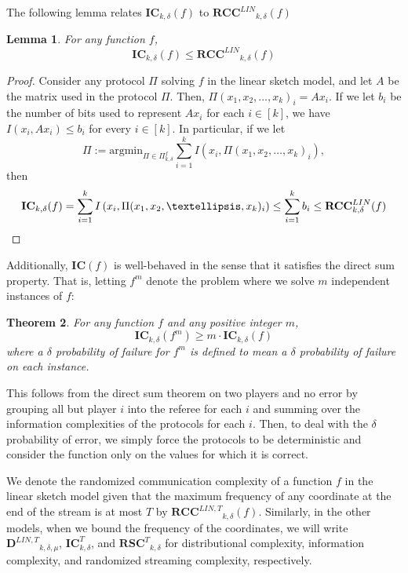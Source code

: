\documentclass[11pt]{article}
\numberwithin{equation}{section}
\newtheorem{theorem}{Theorem}[section]
\newtheorem{lemma}[theorem]{Lemma}
\theoremstyle{definition}
\theoremstyle{plain}
\newcommand{\eqdef}{\ensuremath{:=}}
\newcommand{\rscT}{\ensuremath{\mathbf{RSC}^T}}
\newcommand{\ic}{\ensuremath{\mathbf{IC}}}
\newcommand{\rcclin}{\ensuremath{\mathbf{RCC}^{LIN}}}
\newcommand{\rcclinT}{\ensuremath{\mathbf{RCC}^{LIN,T}}}
\newcommand{\DlinT}{\ensuremath{\mathbf{D}^{LIN,T}}}
\begin{document}
{\color{black}
The following lemma relates $\ic_{k,\delta}(f)$ to $\rcclin_{k,\delta}(f)$
%
\begin{lemma}
For any function $f$,
    $$\ic_{k,\delta}(f) \le \rcclin_{k,\delta}(f)$$
\end{lemma}
\begin{proof}
    Consider any protocol $\Pi$ solving $f$ in the linear sketch model, and let $A$ be the matrix used in the protocol $\Pi$. Then, $\Pi(x_1, x_2, \dots, x_k)_i = Ax_i$. If we let $b_i$ be the number of bits used to represent $Ax_i$ for each $i \in [k]$, we have $I(x_i, Ax_i) \le b_i$ for every $i \in [k]$. In particular, if we let
    $$\Pi \eqdef \text{argmin}_{\Pi \in \Pi^f_{k,\delta}} \sum_{i=1}^k I\left(x_i, \Pi(x_1, x_2, \dots, x_k)_i\right),$$
    then
\begin{equation*}
  \ic_{k,\delta}(f) = \sum_{i=1}^k I\left(x_i, \Pi(x_1, x_2, \dots, x_k)_i\right) \le \sum_{i=1}^k b_i \le \rcclin_{k,\delta}(f) \qedhere
\end{equation*}
%
\end{proof}
}
Additionally, $\ic(f)$ is well-behaved in the sense that it satisfies the direct sum property. That is, letting $f^m$ denote the problem where we solve $m$ independent instances of $f$:

\begin{theorem}
For any function $f$ and any positive integer $m$,
$$\ic_{k,\delta}(f^m) \ge m \cdot \ic_{k,\delta}(f)$$
where a $\delta$ probability of failure for $f^m$ is defined to mean a $\delta$ probability of failure on each instance.
\end{theorem}
This follows from the direct sum theorem on two players and no error by grouping all but player $i$ into the referee for each $i$ and summing over the information complexities of the protocols for each $i$. Then, to deal with the $\delta$ probability of error, we simply force the protocols to be deterministic and consider the function only on the values for which it is correct.

We denote the randomized communication complexity of a function $f$ in the linear sketch model given that the maximum frequency of any coordinate at the end of the stream is at most $T$ by $\rcclinT_{k,\delta}(f)$. Similarly, in the other models, when we bound the frequency of the coordinates, we will write $\DlinT_{k,\delta,\mu}$, $\ic_{k,\delta}^T$, and $\rscT_{k,\delta}$ for distributional complexity, information complexity, and randomized streaming complexity, respectively.   %
%
%
\end{document}
